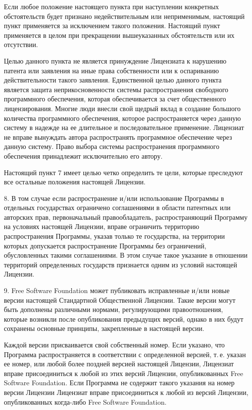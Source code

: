 \begin{small}
Если любое положение настоящего пункта при наступлении конкретных
обстоятельств будет признано недействительным или неприменимым, настоящий
пункт применяется за исключением такого положения. Настоящий пункт
применяется в целом при прекращении вышеуказанных обстоятельств или их
отсутствии.

Целью данного пункта не является принуждение Лицензиата к нарушению
патента или заявления на иные права собственности или к оспариванию
действительности такого заявления. Единственной целью данного пункта
является защита неприкосновенности системы распространения свободного
программного обеспечения, которая обеспечивается за счет общественного
лицензирования. Многие люди внесли свой щедрый вклад в создание большого
количества программного обеспечения, которое распространяется через
данную систему в надежде на ее длительное и последовательное применение.
Лицензиат не вправе вынуждать автора распространять программное
обеспечение через данную систему. Право выбора системы распространения
программного обеспечения принадлежит исключительно его автору.

Настоящий пункт 7 имеет целью четко определить те цели, которые
преследуют все остальные положения настоящей Лицензии.

8. В том случае если распространение и/или использование Программы в
отдельных государствах ограничено соглашениями в области патентных или
авторских прав, первоначальный правообладатель, распространяющий
Программу на условиях настоящей Лицензии, вправе ограничить территорию
распространения Программы, указав только те государства, на территории
которых допускается распространение Программы без ограничений,
обусловленных такими соглашениями. В этом случае такое указание в
отношении территорий определенных государств признается одним из условий
настоящей Лицензии.

9. Free Software Foundation может публиковать исправленные и/или новые
версии настоящей Стандартной Общественной Лицензии. Такие версии могут
быть дополнены различными нормами, регулирующими правоотношения, которые
возникли после опубликования предыдущих версий, однако в них будут
сохранены основные принципы, закрепленные в настоящей версии.

Каждой версии присваивается свой собственный номер. Если указано, что
Программа распространяется в соответствии с определенной версией, т.\,е.
указан ее номер, или любой более поздней версией настоящей Лицензии,
Лицензиат вправе присоединиться к любой из этих версий Лицензии,
опубликованных Free Software Foundation. Если Программа не содержит
такого указания на номер версии Лицензии Лицензиат вправе присоединиться
к любой из версий Лицензии, опубликованных когда-либо Free Software
Foundation.


\end{small}
